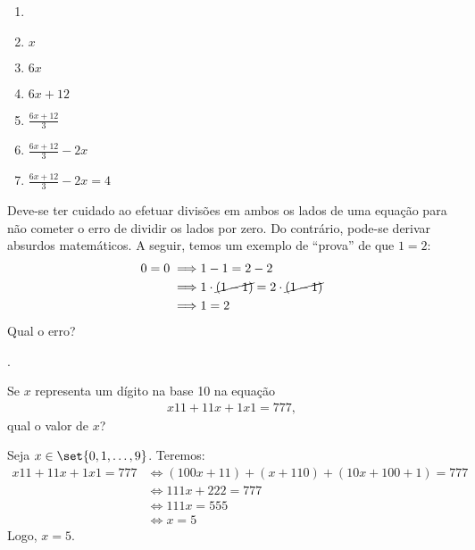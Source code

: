 \begin{solution}
\begin{enumerate}[label=\textbf{\arabic*}.]
	\item[]
	\item $x$
	\item $6x$
	\item $6x+12$
	\item $\frac{6x+12}{3}$
	\item $\frac{6x+12}{3} - 2x$
	\item $\frac{6x+12}{3} - 2x = 4$
\end{enumerate}
\end{solution}

\begin{remark}
Deve-se ter  cuidado ao efetuar divisões em ambos os lados de uma equação para não cometer o erro de dividir os lados por zero. Do contrário, pode-se derivar absurdos matemáticos. A seguir, temos um exemplo de ``prova'' de que $1=2$:
%
\begin{align*}
0=0 \implies & 1-1=2-2 \\
	\implies & 1\cdot\cancel{(1-1)}=2\cdot\cancel{(1-1)} \\
	\implies & 1=2 
\end{align*}
%
Qual o erro?
\end{remark}

\begin{onlineact}
	.
\end{onlineact}

\begin{example}
Se $x$ representa um dígito na base 10 na equação
%
\begin{align*}
x11 + 11x + 1x1 =777,
\end{align*}
%
 qual o valor de $x$?
\end{example}

\begin{solution}
Seja $x \in \set{0,1,\ldots, 9}$. Teremos:
%
\begin{align*}
x11 + 11x + 1x1 =777 & \iff \left(100x + 11 \right) + \left(x + 110 \right) + \left(10x + 100 + 1 \right) = 777 \\
	& \iff 111x+222 = 777 \\
	& \iff 111x = 555 \\
	& \iff x=5 
\end{align*}
%
Logo, $x=5$.
\end{solution}

